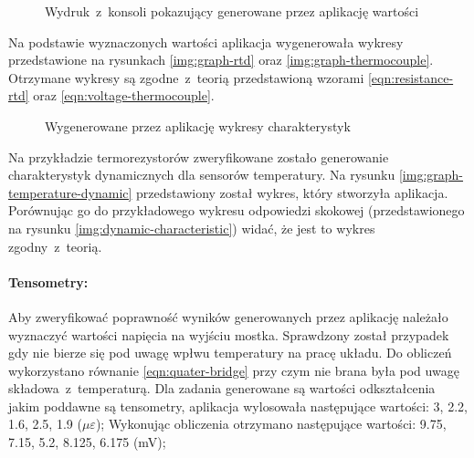 \begin{figure}[!htbp]
  \hfill
  \hfill
  \hfill
  \caption{\label{img:calc-console-temperature}Wydruk~z~konsoli pokazujący generowane przez
    aplikację wartości}
\end{figure}

Na podstawie wyznaczonych wartości aplikacja wygenerowała wykresy przedstawione na rysunkach
\ref{img:graph-rtd} oraz \ref{img:graph-thermocouple}. Otrzymane wykresy są zgodne~z~teorią
przedstawioną wzorami \ref{eqn:resistance-rtd} oraz \ref{eqn:voltage-thermocouple}.

\begin{figure}[!htbp]
  \hfill
  \hfill
  \hfill
  \caption{\label{img:graphs-temperature}Wygenerowane przez aplikację wykresy charakterystyk}
\end{figure}

Na przykładzie termorezystorów zweryfikowane zostało generowanie charakterystyk dynamicznych dla
sensorów temperatury. Na rysunku \ref{img:graph-temperature-dynamic} przedstawiony został wykres,
który stworzyła aplikacja. Porównując go do przykładowego wykresu odpowiedzi skokowej
(przedstawionego na rysunku \ref{img:dynamic-characteristic}) widać, że jest to wykres
zgodny~z~teorią.


\FloatBarrier
\paragraph{Tensometry:} Aby zweryfikować poprawność wyników generowanych przez aplikację należało
wyznaczyć wartości napięcia na wyjściu mostka. Sprawdzony został przypadek gdy nie bierze się pod
uwagę wpłwu temperatury na pracę układu. Do obliczeń wykorzystano równanie \ref{eqn:quater-bridge}
przy czym nie brana była pod uwagę składowa~z~temperaturą. Dla zadania generowane są wartości
odkształcenia jakim poddawne są tensometry, aplikacja wylosowała następujące wartości: 3, 2.2, 1.6,
2.5, 1.9 ($\mu\varepsilon$); Wykonując obliczenia otrzymano następujące wartości: 9.75, 7.15, 5.2,
8.125, 6.175 (mV);

